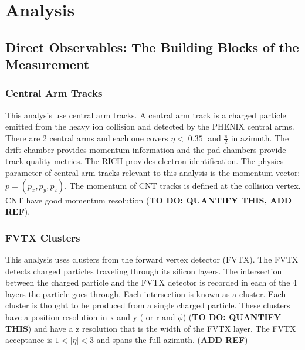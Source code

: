 \chapter{Analysis}
\section{Direct Observables: The Building Blocks of the Measurement}
\subsection{Central Arm Tracks}
This analysis use central arm tracks. A central arm track is a charged particle emitted from the heavy ion collision and detected by the PHENIX central arms.
There are 2 central arms and each one covers $\eta < |0.35|$ and $\frac{\pi}{2}$ in azimuth. The drift chamber provides momentum information and the
pad chambers provide track quality metrics. The RICH provides electron identification. 
The physics parameter of central arm tracks relevant to this analysis is the momentum vector: $p = (p_x, p_y, p_z)$. The momentum of CNT tracks is defined at the
collision vertex. CNT have good momentum resolution (\textbf{TO DO: QUANTIFY THIS, ADD REF}). 
\subsection{FVTX Clusters}
This analysis uses clusters from the forward vertex detector (FVTX). The FVTX detects charged particles traveling through its silicon layers. The intersection between the charged particle
and the FVTX detector is recorded in each of the 4 layers the particle goes through. Each intersection is known as a cluster. Each cluster is thought to be produced from a single charged particle. These clusters have a position resolution in x and y ( or r and $\phi$)
(\textbf{TO DO: QUANTIFY THIS}) and have a z resolution that is the width of the FVTX layer. The FVTX acceptance is $1 < | \eta | < 3$ and spans the full azimuth. (\textbf{ADD REF})
